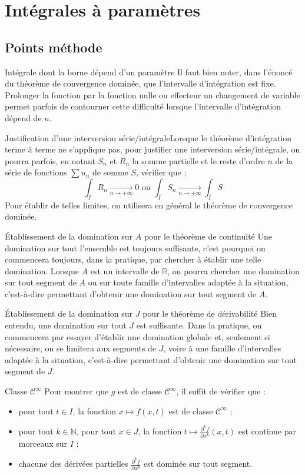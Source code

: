 \documentclass[french]{book}
\newcommand{\N}{\mathbb{N}}
\newcommand{\R}{\mathbb{R}}
\theoremstyle{plain}
\theoremstyle{definition}
\theoremstyle{remark}
\begin{document}
\chapter{Intégrales à paramètres}
\localtableofcontents
\section{Points méthode}
\begin{PM}{Intégrale dont la borne dépend d'un paramètre} Il faut bien noter, dans l'énoncé du théorème de convergence dominée, que l'intervalle d'intégration est fixe. Prolonger la fonction par la fonction nulle ou effecteur un changement de variable permet parfois de contourner cette difficulté lorsque l'intervalle d'intégration dépend de $n$.
\end{PM}
\begin{PM}{Justification d'une interversion série/intégrale}Lorsque le théorème d'intégration terme à terme ne s'applique pas, pour justifier une interversion série/intégrale, on pourra parfois, en notant $S_n$ et $R_n$ la somme partielle et le reste d'ordre $n$ de la série de fonctions $\sum u_n$ de somme $S$, vérifier que : $$\int_IR_n\xrightarrow[n\to+\infty]{}0 \text{  ou  }\int_IS_n\xrightarrow[n\to+\infty]{}\int_I S$$ Pour établir de telles limites, on utilisera en général le théorème de convergence dominée.
\end{PM}
\begin{PM}{Établissement de la domination sur $A$ pour le théorème de continuité} Une domination sur tout l'ensemble est toujours suffisante, c'est pourquoi on commencera toujours, dans la pratique, par chercher à établir une telle domination. Lorsque $A$ est un intervalle de $\R$, on pourra chercher une domination sur tout segment de $A$ ou sur toute famille d'intervalles adaptée à la situation, c'est-à-dire permettant d'obtenir une domination sur tout segment de $A$.
\end{PM}
\begin{PM}{Établissement de la domination sur $J$ pour le théorème de dérivabilité}
Bien entendu, une domination sur tout $J$ est suffisante. Dans la pratique, on commencera par essayer d'établir une domination globale et, seulement si nécessaire, on se limitera aux segments de $J$, voire à une famille d'intervalles adaptée à la situation, c'est-à-dire permettant d'obtenir une domination sur tout segment de $J$.
\end{PM}
\begin{PM}{Classe $\mathcal{C}^\infty$} Pour montrer que $g$ est de classe $\mathcal{C}^\infty$, il suffit de vérifier que : \begin{itemize}
	\item pour tout $t\in I$, la fonction $x\mapsto f(x,t)$ est de classe $\mathcal{C}^\infty$ ;
	\item pour tout $k\in\N$, pour tout $x\in J$, la fonction $\displaystyle t\mapsto\frac{\partial^k f}{\partial x^k}(x,t)$ est continue par morceaux sur $I$ ;
	\item chacune des dérivées partielles $\displaystyle \frac{\partial^k f}{\partial x^k}$ est dominée sur tout segment.
\end{itemize}
\end{PM}
\end{document}
